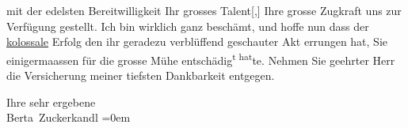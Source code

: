                mit der edelsten Bereitwilligkeit Ihr grosses Talent{[},{]} Ihre grosse Zugkraft uns zur
               Verfügung gestellt. Ich bin wirklich ganz be{\pb}schämt, und hoffe nun dass der \uline{kolossale} Erfolg den ihr geradezu verblüffend
               geschauter Akt errungen hat, Sie einigermaassen für die grosse Mühe
               entschädig\substVorne{}\textsuperscript{t hat}\substDazwischen{}te\substHinten{}. Nehmen Sie geehrter Herr die Versicherung meiner tiefsten
               Dankbarkeit entgegen.\pend
           
\pstart
           {\pb}Ihre sehr ergebene{\\[\baselineskip]}\spacefill\mbox{Berta Zuckerkandl}\pend
           \leftskip=0em{}\endnumbering{}  \newcommand{\dateiname}{L04015}\newcommand{\titel}{Berta Zuckerkandl an Arthur Schnitzler, [29. 3. 1897?]}\newcommand{\editorInnen}{Herausgegeben von Jahnke, SelmaMüller, Martin Anton}

